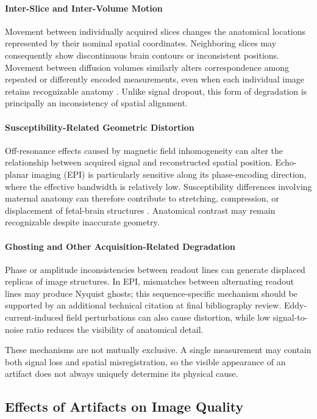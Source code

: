 \paragraph{Inter-Slice and Inter-Volume Motion}
Movement between individually acquired slices changes the anatomical locations represented by their nominal spatial coordinates. Neighboring slices may consequently show discontinuous brain contours or inconsistent positions. Movement between diffusion volumes similarly alters correspondence among repeated or differently encoded measurements, even when each individual image retains recognizable anatomy \autocite{malamateniou2013motion}. Unlike signal dropout, this form of degradation is principally an inconsistency of spatial alignment.

\paragraph{Susceptibility-Related Geometric Distortion}
Off-resonance effects caused by magnetic field inhomogeneity can alter the relationship between acquired signal and reconstructed spatial position. Echo-planar imaging (EPI) is particularly sensitive along its phase-encoding direction, where the effective bandwidth is relatively low. Susceptibility differences involving maternal anatomy can therefore contribute to stretching, compression, or displacement of fetal-brain structures \autocite{snoussi2025haitch}. Anatomical contrast may remain recognizable despite inaccurate geometry.

\paragraph{Ghosting and Other Acquisition-Related Degradation}
Phase or amplitude inconsistencies between readout lines can generate displaced replicas of image structures. In EPI, mismatches between alternating readout lines may produce Nyquist ghosts; this sequence-specific mechanism should be supported by an additional technical citation at final bibliography review. Eddy-current-induced field perturbations can also cause distortion, while low signal-to-noise ratio reduces the visibility of anatomical detail.

These mechanisms are not mutually exclusive. A single measurement may contain both signal loss and spatial misregistration, so the visible appearance of an artifact does not always uniquely determine its physical cause.

\subsection{Effects of Artifacts on Image Quality}

